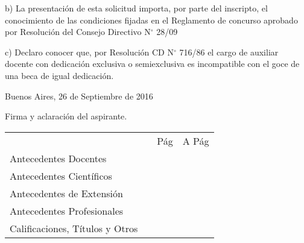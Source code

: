 \documentclass{article}
\newcommand{\fecha}[3]{#1 de #2 de #3}
\begin{document}
\noindent b) La presentación de esta solicitud importa, por parte del inscripto,
el conocimiento de las condiciones fijadas en el Reglamento de concurso aprobado
por Resolución del Consejo Directivo N$^\circ$ 28/09

\noindent c) Declaro conocer que, por Resolución CD N$^\circ$ 716/86 el cargo de
auxiliar docente con dedicación exclusiva o semiexclusiva es incompatible con
el goce de una beca de igual dedicación.


\bigskip
\bigskip
\bigskip
\bigskip

\noindent Buenos Aires, \fecha{26}{Septiembre}{2016}

\bigskip
\bigskip
\bigskip

\noindent \hdashrule{6cm}{0.5pt}{0.75pt}

\noindent Firma y aclaración del aspirante.

\newpage


\bigskip
\bigskip

\noindent \begin{tabular}{lccc}

\vspace{0.3cm}

 &\hspace{2cm} &\textrm{\hspace{0.5cm} P\'ag \hspace{0.5cm}} & \textrm{\hspace{0.5cm} A P\'ag \hspace{0.5cm}} \\

\vspace{0.1cm}

\textrm{Antecedentes Docentes}& & ~\pageref{begin-docentes} & ~\pageref{end-docentes} \\

\vspace{0.1cm}

\textrm{Antecedentes Científicos}& & ~\pageref{begin-cientificos} & ~\pageref{end-cientificos} \\

\vspace{0.1cm}

\textrm{Antecedentes de Extensión}& & ~\pageref{begin-extension} & ~\pageref{end-extension} \\

\vspace{0.1cm}

\textrm{Antecedentes Profesionales}& & ~\pageref{begin-profesionales} & ~\pageref{end-profesionales} \\

\vspace{0.1cm}

\textrm{Calificaciones, Títulos y Otros}& & ~\pageref{begin-otros} & ~\pageref{end-otros} \\

\end{tabular}
\end{document}
